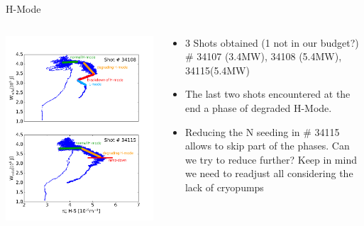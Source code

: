 \documentclass[10pt, compress]{beamer}
\newcommand\Fontvi{\fontsize{8}{7.2}\selectfont}
\begin{document}
\begin{frame}{H-Mode}
  \Fontvi
  \begin{columns}
    \begin{column}{0.6\textwidth}
      \includegraphics[width=\textwidth]{../../Experiments/AUG/analysis/pdfbox/DegradedHModeMarked}
    \end{column}
    \begin{column}{0.4\textwidth}
      \begin{itemize}
        \item 3 Shots obtained (1 not in our budget?) \# 34107
          (3.4MW), 34108 (5.4MW),
          34115(5.4MW)
        \item The last two shots encountered at the end a phase of
          degraded H-Mode.
        \item Reducing the N seeding in \# 34115 allows to skip part
          of the phases. Can we try to reduce further? \alert{Keep in
            mind we need to readjust all considering the lack of cryopumps}
      \end{itemize}
    \end{column}
  \end{columns}
\end{frame}
\end{document}
